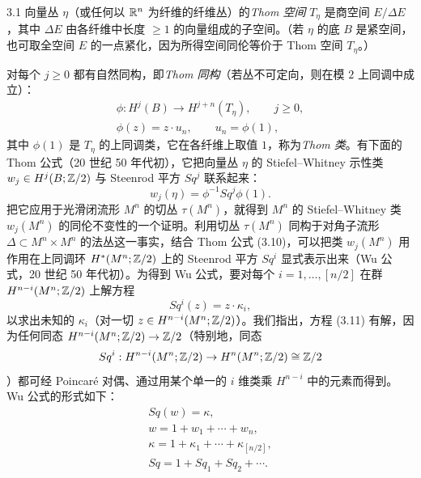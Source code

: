 \begin{definition*}{3.1}
向量丛 $\eta$（或任何以 $\mathbb{R}^n$ 为纤维的纤维丛）的\emph{Thom 空间} $T_\eta$ 是商空间 $E/\Delta E$，其中 $\Delta E$ 由各纤维中长度 $\ge1$ 的向量组成的子空间。（若 $\eta$ 的底 $B$ 是紧空间，也可取全空间 $E$ 的一点紧化，因为所得空间同伦等价于 Thom 空间 $T_\eta$。）
\end{definition*}
对每个 $j\ge0$ 都有自然同构，即\emph{Thom 同构}（若丛不可定向，则在模 $2$ 上同调中成立）：
\begin{equation}
\begin{gathered}
  \phi:H^j(B)\to H^{j+n}(T_\eta),\qquad j\ge0,\\
  \phi(z)=z\cdot u_n,\qquad u_n=\phi(1),
\end{gathered}\tag{3.9}
\end{equation}
其中 $\phi(1)$ 是 $T_\eta$ 的上同调类，它在各纤维上取值 $1$，称为\emph{Thom 类}。有下面的 Thom 公式（20 世纪 50 年代初），它把向量丛 $\eta$ 的 Stiefel--Whitney 示性类 $w_j\in H^j(B;\mathbb{Z}/2)$ 与 Steenrod 平方 $Sq^j$ 联系起来：
\begin{equation}
  w_j(\eta)=\phi^{-1}Sq^j\phi(1). \tag{3.10}
\end{equation}
把它应用于光滑闭流形 $M^n$ 的切丛 $\tau(M^n)$，就得到 $M^n$ 的 Stiefel--Whitney 类 $w_j(M^n)$ 的同伦不变性的一个证明。利用切丛 $\tau(M^n)$ 同构于对角子流形 $\Delta\subset M^n\times M^n$ 的法丛这一事实，结合 Thom 公式 (3.10)，可以把类 $w_j(M^n)$ 用作用在上同调环 $H^*(M^n;\mathbb{Z}/2)$ 上的 Steenrod 平方 $Sq^i$ 显式表示出来（Wu 公式，20 世纪 50 年代初）。为得到 Wu 公式，要对每个 $i=1,\dots,[n/2]$ 在群 $H^{n-i}(M^n;\mathbb{Z}/2)$ 上解方程
\begin{equation}
  Sq^i(z)=z\cdot\kappa_i, \tag{3.11}
\end{equation}
以求出未知的 $\kappa_i$（对一切 $z\in H^{n-i}(M^n;\mathbb{Z}/2)$）。我们指出，方程 (3.11) 有解，因为任何同态 $H^{n-i}(M^n;\mathbb{Z}/2)\to\mathbb{Z}/2$（特别地，同态
\[
  Sq^i:H^{n-i}(M^n;\mathbb{Z}/2)\to H^n(M^n;\mathbb{Z}/2)\cong\mathbb{Z}/2
\]
）都可经 Poincaré 对偶、通过用某个单一的 $i$ 维类乘 $H^{n-i}$ 中的元素而得到。Wu 公式的形式如下：
\begin{equation}
\begin{gathered}
  Sq(w)=\kappa,\\
  w=1+w_1+\cdots+w_n,\\
  \kappa=1+\kappa_1+\cdots+\kappa_{[n/2]},\\
  Sq=1+Sq_1+Sq_2+\cdots.
\end{gathered}\tag{3.12}
\end{equation}
